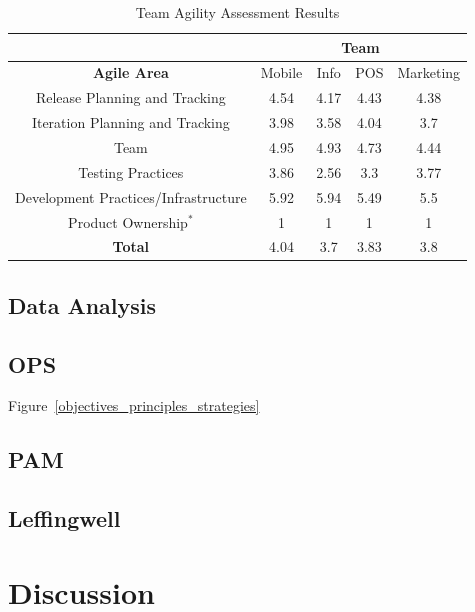 \begin{table} [H]
\caption{Team Agility Assessment Results}
\label{table:taa_results}
\begin{tabular}{| c | c | c | c | c |}
\hline
  & \multicolumn{4}{c|}{\textbf{Team}} \\ \hline
\textbf{Agile Area} & Mobile & Info & POS & Marketing \\ \hline
Release Planning and Tracking & 4.54 & 4.17 & 4.43 & 4.38 \\ \hline
Iteration Planning and Tracking & 3.98 & 3.58 & 4.04 & 3.7 \\ \hline
Team & 4.95 & 4.93 & 4.73 & 4.44 \\ \hline
Testing Practices & 3.86 & 2.56 & 3.3 & 3.77 \\ \hline
Development Practices/Infrastructure & 5.92 & 5.94 & 5.49 & 5.5 \\ \hline
Product Ownership$^\ast$ & 1 & 1 & 1 & 1 \\ \hline 
\textbf{Total} & 4.04 & 3.7 & 3.83 & 3.8 \\ \hline
\end{tabular}
\end{table}

\subsection{Data Analysis}


\subsection{OPS}
Figure~\ref{objectives_principles_strategies}
\subsection{PAM}
\subsection{Leffingwell}
\section{Discussion}
